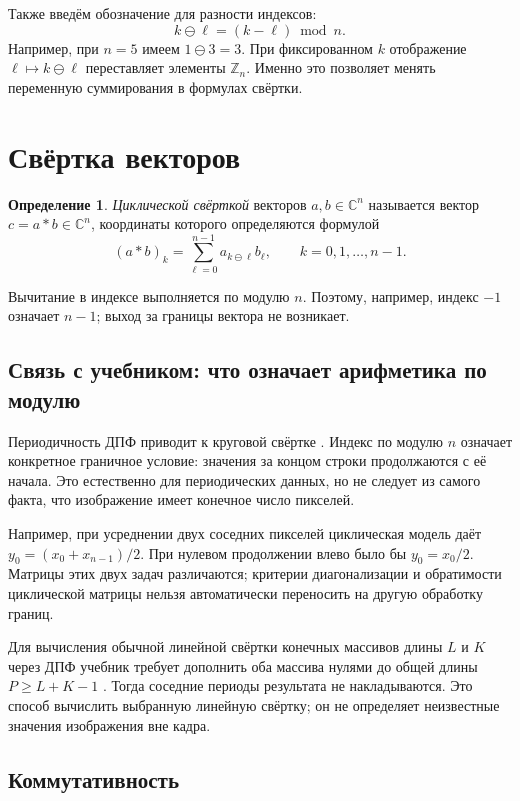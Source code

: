 \documentclass[12pt,a4paper]{article}
\theoremstyle{definition}
\newtheorem{definition}{Определение}
\theoremstyle{remark}
\newcommand{\CC}{\mathbb{C}}
\newcommand{\ZZ}{\mathbb{Z}}
\begin{document}
Также введём обозначение для разности индексов:
\[
  k\ominus\ell=(k-\ell)\bmod n.
\]
Например, при $n=5$ имеем $1\ominus3=3$. При фиксированном $k$
отображение $\ell\mapsto k\ominus\ell$ переставляет элементы $\ZZ_n$.
Именно это позволяет менять переменную суммирования в формулах свёртки.

\section{Свёртка векторов}

\begin{definition}
\emph{Циклической свёрткой} векторов $a,b\in\CC^n$ называется вектор
$c=a*b\in\CC^n$, координаты которого определяются формулой
\[
  \boxed{(a*b)_k=\sum_{\ell=0}^{n-1}a_{k\ominus\ell}b_\ell},
  \qquad k=0,1,\dots,n-1.
\]
\end{definition}

Вычитание в индексе выполняется по модулю $n$. Поэтому, например, индекс
$-1$ означает $n-1$; выход за границы вектора не возникает.

\subsection{Связь с учебником: что означает арифметика по модулю}

Периодичность ДПФ приводит к круговой свёртке
\cite[\S\,4.4.1, с.~270]{GW2012}.
Индекс по модулю $n$ означает конкретное граничное условие:
значения за концом строки продолжаются с её начала.
Это естественно для периодических данных, но не следует
из самого факта, что изображение имеет конечное число пикселей.

Например, при усреднении двух соседних пикселей циклическая
модель даёт $y_0=(x_0+x_{n-1})/2$. При нулевом продолжении
влево было бы $y_0=x_0/2$. Матрицы этих двух задач различаются;
критерии диагонализации и обратимости циклической матрицы
нельзя автоматически переносить на другую обработку границ.

Для вычисления обычной линейной свёртки конечных массивов длины
$L$ и $K$ через ДПФ учебник требует дополнить оба массива нулями
до общей длины $P\geqslant L+K-1$
\cite[\S\,4.6.6, с.~300]{GW2012}.
Тогда соседние периоды результата не накладываются.
Это способ вычислить выбранную линейную свёртку; он не определяет
неизвестные значения изображения вне кадра.

\subsection{Коммутативность}
\end{document}
